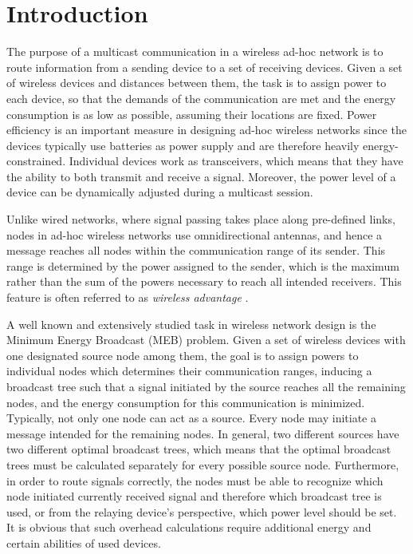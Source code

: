 \section{Introduction}

\label{intro}

The purpose of a multicast communication in a wireless ad-hoc network is to route information from a sending device to a set of receiving devices. Given a set of wireless devices and distances between them, the task is to assign power to each device, so that the demands of the communication are met and the energy consumption is as low as possible, assuming their locations are fixed. Power efficiency is an important measure in designing ad-hoc wireless networks since the devices typically use batteries as power supply and are therefore heavily energy-constrained. Individual devices work as transceivers, which means that they have the ability to both transmit and receive a signal. Moreover, the power level of a device can be dynamically adjusted during a multicast session.

Unlike wired networks, where signal passing takes place along pre-defined links, nodes in ad-hoc wireless networks use omnidirectional antennas, and hence a message reaches all nodes within the communication range of its sender. This range is determined by the power assigned to the sender, which is the maximum rather than the sum of the powers necessary to reach all intended receivers. This feature is often referred to as \emph{wireless advantage} \cite{Wieseltier00onthe}. 

A well known and extensively studied task in wireless network design is the Minimum Energy Broadcast (MEB) problem. Given a set of wireless devices with one designated source node among them, the goal is to assign powers to individual nodes  which determines their communication ranges, inducing a broadcast tree such that a signal initiated by the source reaches all the remaining nodes, and the energy consumption for this communication is minimized. Typically, not only one node can act as a source. Every node may initiate a message intended for the remaining nodes. In general, two different sources have two different optimal broadcast trees, which means that the optimal broadcast trees must be calculated separately for every possible source node. Furthermore, in order to route signals correctly, the nodes must be able to recognize which node initiated currently received signal and therefore which broadcast tree is used, or from the relaying device's perspective, which power level should be set. It is obvious that such overhead calculations require additional energy and certain abilities of used devices.


